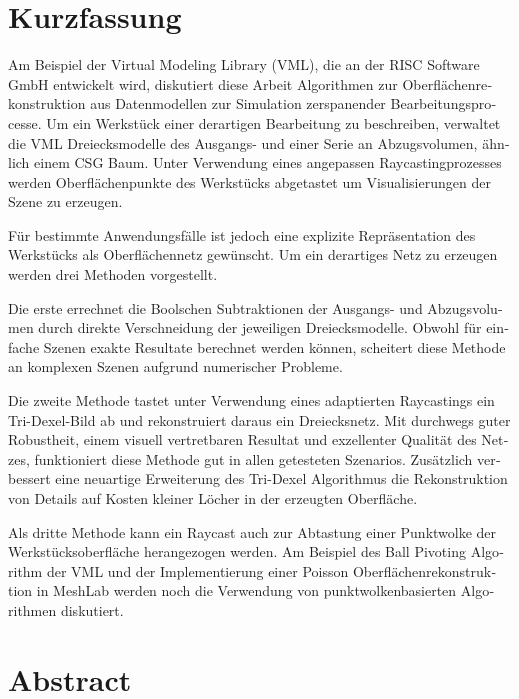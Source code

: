 \chapter*{Kurzfassung}

\begin{otherlanguage}{ngerman}
	Am Beispiel der Virtual Modeling Library (VML), die an der RISC Software GmbH entwickelt wird, diskutiert diese Arbeit Algorithmen zur Oberflächenrekonstruktion aus Datenmodellen zur Simulation zerspanender Bearbeitungsprocesse.
	Um ein Werkstück einer derartigen Bearbeitung zu beschreiben, verwaltet die VML Dreiecksmodelle des Ausgangs- und einer Serie an Abzugsvolumen, ähnlich einem CSG Baum.
	Unter Verwendung eines angepassen Raycastingprozesses werden Oberflächenpunkte des Werkstücks abgetastet um Visualisierungen der Szene zu erzeugen.
	
	Für bestimmte Anwendungsfälle ist jedoch eine explizite Repräsentation des Werkstücks als Oberflächennetz gewünscht.
	Um ein derartiges Netz zu erzeugen werden drei Methoden vorgestellt.
	
	Die erste errechnet die Boolschen Subtraktionen der Ausgangs- und Abzugsvolumen durch direkte Verschneidung der jeweiligen Dreiecksmodelle.
	Obwohl für einfache Szenen exakte Resultate berechnet werden können, scheitert diese Methode an komplexen Szenen aufgrund numerischer Probleme.
	
	Die zweite Methode tastet unter Verwendung eines adaptierten Raycastings ein Tri-Dexel-Bild ab und rekonstruiert daraus ein Dreiecksnetz.
	Mit durchwegs guter Robustheit, einem visuell vertretbaren Resultat und exzellenter Qualität des Netzes, funktioniert diese Methode gut in allen getesteten Szenarios.
	Zusätzlich verbessert eine neuartige Erweiterung des Tri-Dexel Algorithmus die Rekonstruktion von Details auf Kosten kleiner Löcher in der erzeugten Oberfläche.
	
	Als dritte Methode kann ein Raycast auch zur Abtastung einer Punktwolke der Werkstücksoberfläche herangezogen werden.
	Am Beispiel des Ball Pivoting Algorithm der VML und der Implementierung einer Poisson Oberflächenrekonstruktion in MeshLab werden noch die Verwendung von punktwolkenbasierten Algorithmen diskutiert.
\end{otherlanguage}

\pagebreak

\chapter*{Abstract}

